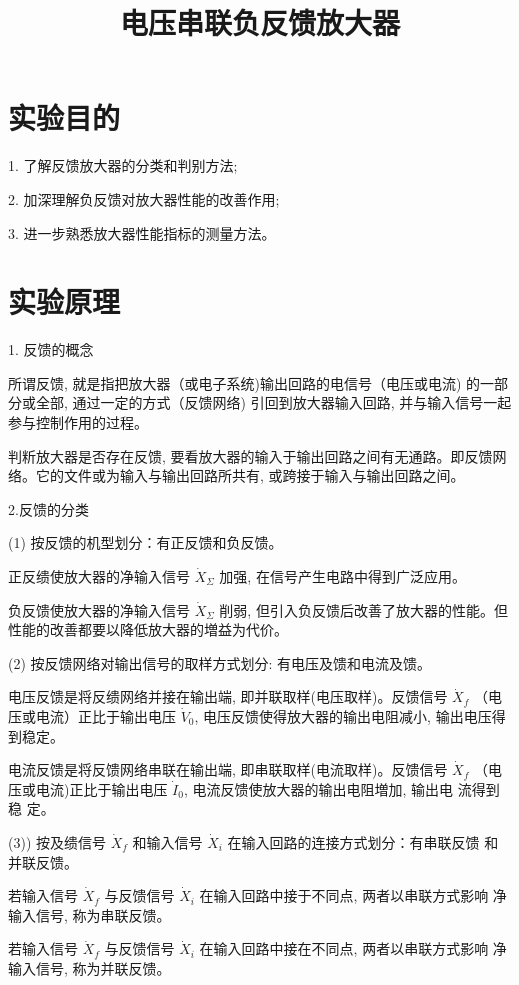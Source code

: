 \documentclass[lang=cn,11pt]{elegantpaper}
\title{电压串联负反馈放大器}
\author{}
\institute{中国科学技术大学}
\date{}
\begin{document}
\maketitle

\section{实验目的}
1. 了解反馈放大器的分类和判别方法;

2. 加深理解负反馈对放大器性能的改善作用;

3. 进一步熟悉放大器性能指标的测量方法。

\section{实验原理}
1. 反馈的概念


所谓反馈, 就是指把放大器（或电子系统)输出回路的电信号（电压或电流) 的一部分或全部, 通过一定的方式（反馈网络) 引回到放大器输入回路, 并与输入信号一起参与控制作用的过程。


判䉼放大器是否存在反馈, 要看放大器的输入于输出回路之间有无通路。即反馈网络。它的文件或为输入与输出回路所共有, 或跨接于输入与输出回路之间。 

2.反馈的分类


(1) 按反馈的机型划分：有正反馈和负反馈。


正反缋使放大器的净输入信号 $\dot{X}_{\Sigma}$ 加强, 在信号产生电路中得到广泛应用。


负反馈使放大器的净输入信号 $\dot{X}_{\Sigma}$ 削弱, 但引入负反馈后改善了放大器的性能。但性能的改善都要以降低放大器的増益为代价。


(2) 按反馈网络对输出信号的取样方式划分: 有电压及馈和电流及馈。 


电压反馈是将反缋网络并接在输出端, 即并联取样(电压取样)。反馈信号 $\dot{X}_{f}$ （电压或电流）正比于输出电压 $\dot{V}_{0}$, 电压反馈使得放大器的输出电阻减小, 输出电压得到稳定。


电流反馈是将反馈网络串联在输出端, 即串联取样(电流取样)。反馈信号 $\dot{X}_{f}$ （电压或电流)正比于输出电压 $\dot{I}_{0}$, 电流反馈使放大器的输出电阻増加, 输出电 流得到 稳 定。


(3)) 按及缋信号 $\dot{X}_{f}$ 和输入信号 $\dot{X}_{i}$ 在输入回路的连接方式划分：有串联反馈 和并联反馈。


若输入信号 $\dot{X}_{f}$ 与反馈信号 $\dot{X}_{i}$ 在输入回路中接于不同点, 两者以串联方式影响 净输入信号, 称为串联反馈。


若输入信号 $\dot{X}_{f}$ 与反馈信号 $\dot{X}_{i}$ 在输入回路中接在不同点, 两者以串联方式影响 净输入信号, 称为并联反馈。
\end{document}

